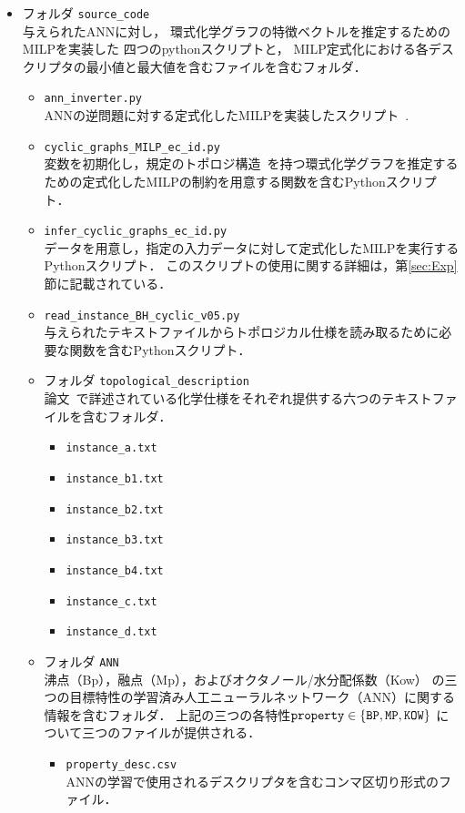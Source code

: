 \documentclass[11pt, titlepage, dvipdfmx, twoside]{jarticle}
\newcommand{\target}{目標}
\begin{document}
\begin{itemize}

\item フォルダ {\tt source\_code}\\
  与えられたANNに対し，
  環式化学グラフの特徴ベクトルを推定するためのMILPを実装した
  四つのpythonスクリプトと，
  MILP定式化における各デスクリプタの最小値と最大値を含むファイルを含むフォルダ．

\begin{itemize}

\item {\tt ann\_inverter.py}\\
ANNの逆問題に対する定式化したMILPを実装したスクリプト~\cite{AN19}.

\item {\tt cyclic\_graphs\_MILP\_ec\_id.py}\\
変数を初期化し，規定のトポロジ構造~\cite{cyclic_BH_arxiv}を持つ環式化学グラフを推定するための定式化したMILPの制約を用意する関数を含むPythonスクリプト．

\item {\tt infer\_cyclic\_graphs\_ec\_id.py}\\
データを用意し，指定の入力データに対して定式化したMILPを実行するPythonスクリプト．
このスクリプトの使用に関する詳細は，第\ref{sec:Exp}節に記載されている．

\item {\tt read\_instance\_BH\_cyclic\_v05.py}\\
与えられたテキストファイルからトポロジカル仕様を読み取るために必要な関数を含むPythonスクリプト．

\item フォルダ {\tt topological\_description}\\
論文~\cite{cyclic_BH_arxiv}で詳述されている化学仕様をそれぞれ提供する六つのテキストファイルを含むフォルダ．
%
\begin{itemize}
 \item {\tt instance\_a.txt}
 \item {\tt instance\_b1.txt}
 \item {\tt instance\_b2.txt}
 \item {\tt instance\_b3.txt}
 \item {\tt instance\_b4.txt}
 \item {\tt instance\_c.txt}
 \item {\tt instance\_d.txt}
\end{itemize}

\item フォルダ {\tt ANN}\\
沸点（Bp），融点（Mp），およびオクタノール/水分配係数（Kow）
の三つの\target 特性の学習済み人工ニューラルネットワーク（ANN）に関する情報を含むフォルダ．
上記の三つの各特性${\tt property}\in \{{\tt BP, MP, KOW}\}$ について三つのファイルが提供される．
%
\begin{itemize}
\item {\tt property\_desc.csv}\\
ANNの学習で使用されるデスクリプタを含むコンマ区切り形式のファイル．


\end{itemize}
\end{itemize}
\end{itemize}
\end{document}

